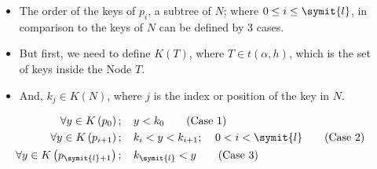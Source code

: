 \documentclass{beamer}
\begin{document}
\begin{frame}
    \begin{columns}
        \begin{column}{\textlecolumn}
            \begin{block}{}
                \begin{itemize}
                    \item The order of the keys of \(p_i\), a subtree of \(N\); where \(0 \leq i \leq \symit{l}\), in comparison to the keys of \(N\) can be defined by 3 cases.
                    \item But first, we need to define \(K\left(T\right)\), where \(T \in t\left(\alpha, h\right)\), which is the set of keys inside the Node \(T\).
                    \item And, \(k_j \in K\left(N\right)\), where \(j\) is the index or position of the key in \(N\).
                \end{itemize}
                \vspace{0.5cm}
                \begin{align}
                    \forall y \in K\left(p_0\right);\mspace{20mu}& y < k_0 \tag{Case 1}\label{case1-subt-t-comp} \\
                    \forall y \in K\left(p_{i + 1}\right);\mspace{20mu}& k_i < y < k_{i + 1};\mspace{20mu} 0 < i < \symit{l} \tag{Case 2}\label{case2-subt-t-comp} \\
                    \forall y \in K\left(p_{\symit{l} + 1}\right);\mspace{20mu}& k_{\symit{l}} < y \tag{Case 3}\label{case3-subt-t-comp}
                \end{align}
            \end{block}
        \end{column}
        \begin{column}{\textricolumn}
            \begin{block}{}
            \end{block}
        \end{column}
    \end{columns}
    
    \framebreak


\end{frame}
\end{document}
